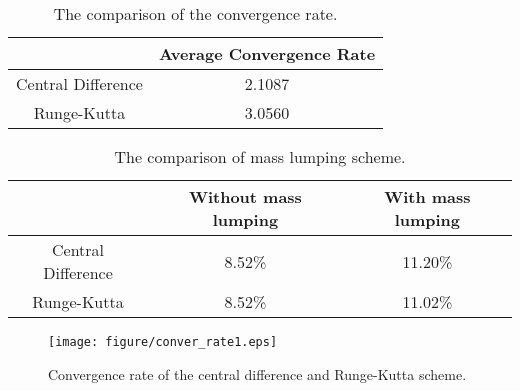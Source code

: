 \documentclass[preprint,12pt]{elsarticle}
\begin{document}
\begin{table}[H]
\centering
\begin{tabular}{c|c}
~ & Average Convergence Rate \\
\hline
Central Difference&  2.1087 \\
\hline
Runge-Kutta  & 3.0560 \\
\hline
\end{tabular}
\caption{The comparison of the convergence rate.}
 \label{table2}
\end{table} 
\begin{table}[H]
\centering
\begin{tabular}{c|c|c}
~ & Without mass lumping & With mass lumping  \\
\hline
Central Difference& 8.52\% & 11.20\%  \\
\hline
Runge-Kutta & 8.52\% & 11.02\%  \\
\hline
\end{tabular}
\caption{The comparison of mass lumping scheme.}
 \label{tableMK30}
\end{table}
\begin{figure}[H]
     \centering
     \texttt{[image: figure/conver\_rate1.eps]}
     \caption{Convergence rate of the central difference and Runge-Kutta scheme.}
     \label{fig:f0112}
 \end{figure}
\end{document}
